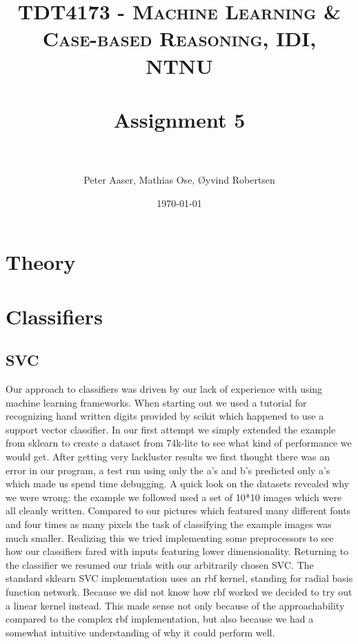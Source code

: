 \documentclass[paper=a4, fontsize=11pt]{scrartcl} %
\title{	
    \normalfont \normalsize 
    \textsc{TDT4173 - Machine Learning \& Case-based Reasoning, IDI, NTNU} \\ [25pt] %
    \horrule{0.5pt} \\[0.4cm] %
    \huge Assignment 5 \\ %
    \horrule{2pt} \\[0.5cm] %
}
\author{Peter Aaser, Mathias Ose, Øyvind Robertsen} %
\date{\normalsize\today} %
\numberwithin{equation}{section} %
\numberwithin{figure}{section} %
\numberwithin{table}{section} %
\begin{document}
\maketitle %


\section{Theory}

\section{Classifiers}
\subsection{SVC}
Our approach to classifiers was driven by our lack of experience with using machine learning frameworks.
When starting out we used a tutorial for recognizing hand written digits provided by scikit which happened to use a support vector classifier. %
In our first attempt we simply extended the example from sklearn to create a dataset from 74k-lite to see what kind of performance we would get.
After getting very lackluster results we first thought there was an error in our program, a test run using only the a's and b's predicted only a's which made us spend time debugging.
A quick look on the datasets revealed why we were wrong: the example we followed used a set of 10*10 images which were all cleanly written. 
Compared to our pictures which featured many different fonts and four times as many pixels the task of classifying the example images was much smaller.
Realizing this we tried implementing some preprocessors to see how our classifiers fared with inputs featuring lower dimensionality.
Returning to the classifier we resumed our trials with our arbitrarily chosen SVC.
The standard sklearn SVC implementation uses an rbf kernel, standing for radial basis function network.
Because we did not know how rbf worked we decided to try out a linear kernel instead.
This made sense not only because of the approachability compared to the complex rbf implementation, but also because we had a somewhat intuitive understanding of why it could perform well.
\end{document}
